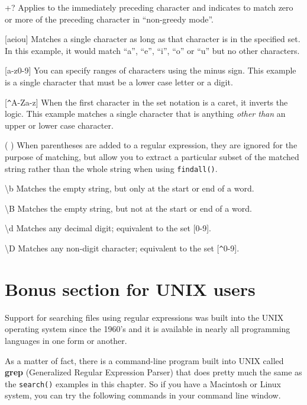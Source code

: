 \documentclass[10pt]{book}
\begin{document}
+? \newline
Applies to the immediately preceding character and indicates to match zero or more of the preceding character in ``non-greedy mode''.

[aeiou] \newline
Matches a single character as long as that character is in the specified set.  In this example, it would match ``a'', ``e'', ``i'', ``o'' or ``u'' but no other characters.

[a-z0-9] \newline
You can specify ranges of characters using the minus sign.  This example is a single character that must be a lower case letter or a digit.

[\verb"^"A-Za-z] \newline
When the first character in the set notation is a caret, it inverts the logic.  This example matches a single character that is anything {\em other than} an upper or lower case character.

( ) \newline
When parentheses are added to a regular expression, they are ignored for the purpose of matching, but allow you to extract a particular subset of the matched string rather than the whole string when using {\tt findall()}.

{\textbackslash}b \newline
Matches the empty string, but only at the start or end of a word.

{\textbackslash}B \newline
Matches the empty string, but not at the start or end of a word.

{\textbackslash}d \newline
Matches any decimal digit; equivalent to the set [0-9].

{\textbackslash}D \newline
Matches any non-digit character; equivalent to the set [\verb"^"0-9].

\section{Bonus section for UNIX users}

Support for searching files using regular expressions was built into the UNIX operating system 
since the 1960's and it is available in nearly all programming languages in one form or another.

As a matter of fact, there is a command-line program built into UNIX 
called {\bf grep} (Generalized Regular Expression Parser) that does pretty much 
the same as the {\tt search()} examples in this chapter.  So if you have a 
Macintosh or Linux system, you can try the following commands in your command line window.
\end{document}
